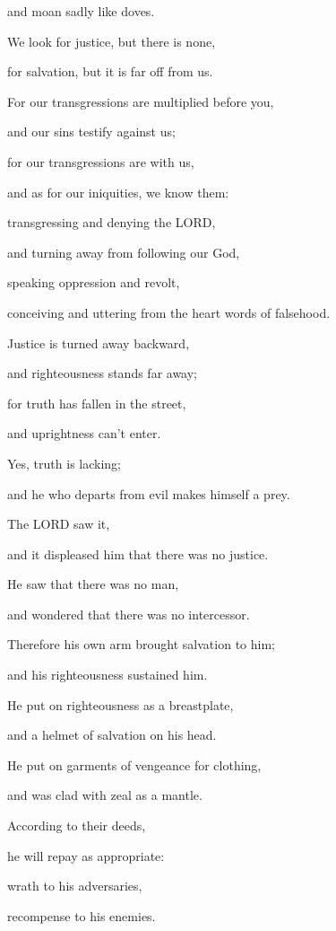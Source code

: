and moan sadly like doves.

We look for justice, but there is none,

for salvation, but it is far off from us.


\vspace{\baselineskip} \myverse{}For our transgressions are multiplied before you,

and our sins testify against us;

for our transgressions are with us,

and as for our iniquities, we know them:

\myverse{}transgressing and denying the LORD,

and turning away from following our God,

speaking oppression and revolt,

conceiving and uttering from the heart words of falsehood.

\myverse{}Justice is turned away backward,

and righteousness stands far away;

for truth has fallen in the street,

and uprightness can’t enter.

\myverse{}Yes, truth is lacking;

and he who departs from evil makes himself a prey.

\vspace{\baselineskip} 
The LORD saw it,

and it displeased him that there was no justice.

\myverse{}He saw that there was no man,

and wondered that there was no intercessor.

Therefore his own arm brought salvation to him;

and his righteousness sustained him.

\myverse{}He put on righteousness as a breastplate,

and a helmet of salvation on his head.

He put on garments of vengeance for clothing,

and was clad with zeal as a mantle.

\myverse{}According to their deeds,

he will repay as appropriate:

wrath to his adversaries,

recompense to his enemies.

